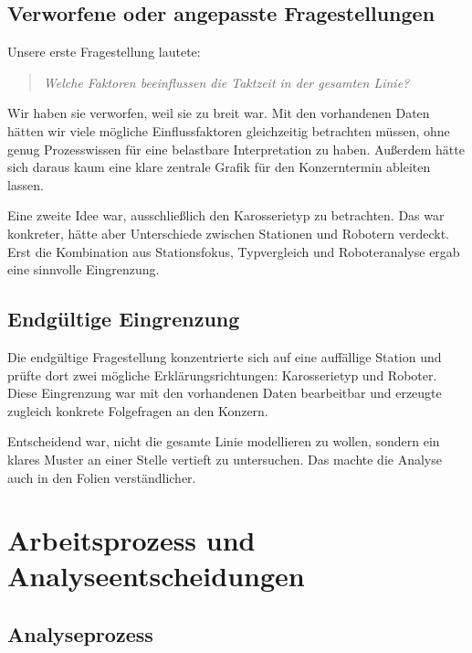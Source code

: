 \documentclass[a4paper, 11pt]{article}
\begin{document}
\subsection{Verworfene oder angepasste Fragestellungen}

Unsere erste Fragestellung lautete:

\begin{quote}
\textit{Welche Faktoren beeinflussen die Taktzeit in der gesamten Linie?}
\end{quote}

Wir haben sie verworfen, weil sie zu breit war. Mit den vorhandenen Daten hätten wir viele mögliche Einflussfaktoren gleichzeitig betrachten müssen, ohne genug Prozesswissen für eine belastbare Interpretation zu haben. Außerdem hätte sich daraus kaum eine klare zentrale Grafik für den Konzerntermin ableiten lassen.

Eine zweite Idee war, ausschließlich den Karosserietyp zu betrachten. Das war konkreter, hätte aber Unterschiede zwischen Stationen und Robotern verdeckt. Erst die Kombination aus Stationsfokus, Typvergleich und Roboteranalyse ergab eine sinnvolle Eingrenzung.

\subsection{Endgültige Eingrenzung}

Die endgültige Fragestellung konzentrierte sich auf eine auffällige Station und prüfte dort zwei mögliche Erklärungsrichtungen: Karosserietyp und Roboter. Diese Eingrenzung war mit den vorhandenen Daten bearbeitbar und erzeugte zugleich konkrete Folgefragen an den Konzern.

Entscheidend war, nicht die gesamte Linie modellieren zu wollen, sondern ein klares Muster an einer Stelle vertieft zu untersuchen. Das machte die Analyse auch in den Folien verständlicher.

\section{Arbeitsprozess und Analyseentscheidungen}

\subsection{Analyseprozess}
\end{document}
